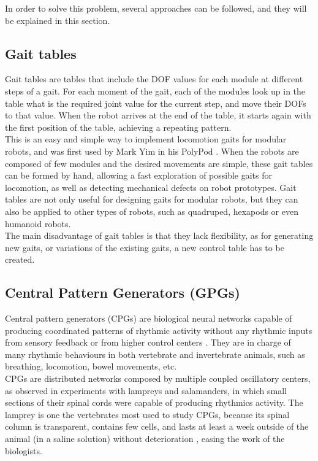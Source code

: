 In order to solve this problem, several approaches can be followed, and they will be explained in this section.\\

\subsection{Gait tables}
\label{gait_gaittables}

Gait tables are tables that include the DOF values for each module at different steps of a gait. For each moment of the gait, each of the modules look up in the table what is the required joint value for the current step, and move their DOFs to that value. When the robot arrives at the end of the table, it starts again with the first position of the table, achieving a repeating pattern.\\

This is an easy and simple way to implement locomotion gaits for modular robots, and was first used by Mark Yim in his PolyPod \cite{}. When the robots are composed of few modules and the desired movements are simple, these gait tables can be formed by hand, allowing a fast exploration of possible gaits for locomotion, as well as detecting mechanical defects on robot prototypes. Gait tables are not only useful for designing gaits for modular robots, but they can also be applied to other types of robots, such as quadruped, hexapods or even humanoid robots.\\

The main disadvantage of gait tables is that they lack flexibility, as for generating new gaits, or variations of the existing gaits, a new control table has to be created.\\

\subsection{Central Pattern Generators (GPGs)}
\label{gait_cpgs}
Central pattern generators (CPGs) are biological neural networks capable of producing coordinated patterns of rhythmic activity without any rhythmic inputs from sensory feedback or from higher control centers \cite{}. They are in charge of many rhythmic behaviours in both vertebrate and invertebrate animals, such as breathing, locomotion, bowel movements, etc.\\

CPGs are distributed networks composed by multiple coupled oscillatory centers, as observed in experiments with lampreys and salamanders, in which small sections of their spinal cords were capable of producing rhythmics activity. The lamprey is one the vertebrates most used to study CPGs, because its spinal column is transparent, contains few cells, and lasts at least a week outside
of the animal (in a saline solution) without deterioration \cite{}, easing the work of the biologists.\\

